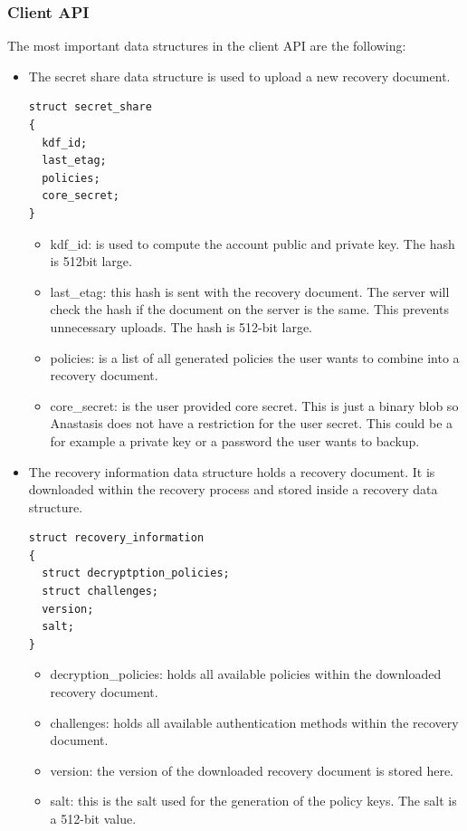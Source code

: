 \subsubsection{Client API}

The most important data structures in the client API are the following:

\begin{itemize}
  \item
The secret share data structure is used to upload a new recovery document.
\begin{lstlisting}
struct secret_share
{
  kdf_id;
  last_etag;
  policies;
  core_secret;
}
\end{lstlisting}
\begin{itemize}
\item kdf\_id: is used to compute the account public and private key. The hash is 512bit large.
\item last\_etag: this hash is sent with the recovery document. The server will check the hash if the document on the server is the same. This prevents unnecessary uploads. The hash is 512-bit large.
\item policies: is a list of all generated policies the user wants to combine into a recovery document.
\item core\_secret: is the user provided core secret. This is just a binary blob so Anastasis does not have a restriction for the user secret. This could be a for example a private key or a password the user wants to backup.
\end{itemize}

  \item
The recovery information data structure holds a recovery document. It is downloaded within the recovery process and stored inside a recovery data structure.
\begin{lstlisting}
struct recovery_information
{
  struct decryptption_policies;
  struct challenges;
  version;
  salt;
}
\end{lstlisting}
\begin{itemize}
\item decryption\_policies: holds all available policies within the downloaded recovery document.
\item challenges: holds all available authentication methods within the recovery document.
\item version: the version of the downloaded recovery document is stored here.
\item salt: this is the salt used for the generation of the policy keys. The salt is a 512-bit value.
\end{itemize}


\end{itemize}
